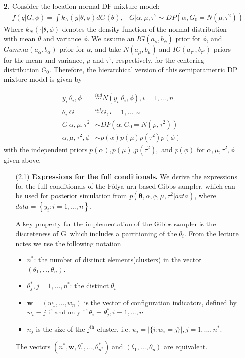 \documentclass[a4paper, 10pt]{article}
\newcommand{\yi}{y_i}
\newcommand{\nstar}{n^*}
\newcommand{\startheta}{\theta_j^*}
\newcommand{\thi}{\theta_i}
\newcommand{\wbold}{\pmb{w}}
\newcommand{\thetbold}{\pmb{\theta}}
\newcommand{\tausq}{\tau^2}
\newcommand{\aalpha}{a_\alpha}
\newcommand{\balpha}{b_\alpha}
\newcommand{\amu}{a_\mu}
\newcommand{\bmu}{b_\mu}
\newcommand{\atau}{a_{\tausq}}
\newcommand{\btau}{b_{\tausq}}
\newcommand{\ind}{\stackrel{ind}{\sim}}
\newcommand{\iid}{\stackrel{iid}{\sim}}
\newcommand{\parenth}[1]{\left(#1\right)}
\newcommand{\curlies}[1]{ \left\{#1\right\} }
\newcommand{\absval}[1]{ \left|#1\right| }
\begin{document}
\begin{enumerate}
    \item[\textbf{2.}] Consider the location normal DP mixture model:
    \begin{align*}
        &f(y|G,\phi) = \int k_N(y|\theta,\phi) dG(\theta), &G|\alpha,\mu,\tausq \sim DP(\alpha, G_0 = N(\mu, \tausq))     
    \end{align*}
    Where $k_N(\cdot|\theta,\phi)$ denotes the density function of the normal distribution with mean $\theta$ and variance $\phi$. We assume an $IG(a_\phi, b_\phi)$ prior for $\phi$, and $Gamma(\aalpha, \balpha)$ prior for $\alpha$, and take $N(\amu, \bmu)$ and $IG(\atau, \btau)$ priors for the mean and variance, $\mu$ and $\tausq$, respectively, for the centering distribution $G_0$. Therefore, the hierarchical version of this semiparametric DP mixture model is given by
    
    \begin{align*}
        \yi|\thi, \phi &\ind N(\yi|\thi, \phi), i = 1,...,n\\
        \thi|G &\iid G, i = 1,...,n\\
        G|\alpha,\mu,\tausq &\sim DP(\alpha, G_0 = N(\mu, \tausq))\\
        \alpha, \mu,\tausq,\phi &\sim p(\alpha)p(\mu)p(\tausq)p(\phi)
    \end{align*}
    with the independent priors $p(\alpha), p(\mu), p(\tausq),$ and $p(\phi)$ for $\alpha, \mu, \tausq, \phi$ given above.
    
    \begin{enumerate}
        \item[(2.1)] \textbf{Expressions for the full conditionals.} We derive the expressions for the full conditionals of the P\`olya urn based Gibbs sampler, which can be used for posterior simulation from $p(\thetbold, \alpha, \phi, \mu, \tausq|data)$, where $data=\curlies{\yi:i=1,...,n}$.
        
        A key property for the implementation of the Gibbs sampler is the discreteness of G, which includes a partitioning of the $\thi$. From the lecture notes we use the following notation
        \begin{itemize}
            \item $\nstar$: the number of distinct elements(clusters) in the vector $(\theta_1,...,\theta_n)$.
            \item $\startheta, j=1,...,\nstar$: the distinct $\thi$
            \item $\pmb{w} = (w_1,...,w_n)$ is the vector of configuration indicators, defined by $w_i =j$ if and only if $\thi = \startheta, i = 1,...,n$
            \item $n_j$ is the size of the $j^{\text{th}}$ cluster, i.e. $n_j = \absval{\{i: w_i =j \}}, j = 1,...,\nstar$.
        \end{itemize}
        The vectors $\parenth{\nstar, \wbold, \theta_1^*,...,\theta_{\nstar}^* }$ and $(\theta_1, ..., \theta_n)$ are equivalent. \\ 
        

\end{enumerate}
\end{enumerate}
\end{document}
